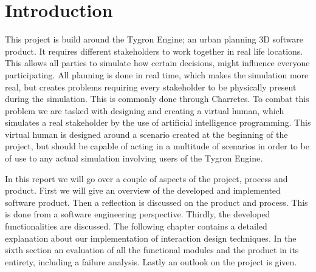 \section{Introduction}

This project is build around the Tygron Engine; an urban planning 3D software product. It requires different stakeholders to work together in real life locations. This allows all parties to simulate how certain decisions, might influence everyone participating. All planning is done in real time, which makes the simulation more real, but creates problems requiring every stakeholder to be physically present during the simulation. This is commonly done through Charretes\cite{Todd13}. To combat this problem we are tasked with designing and creating a virtual human, which simulates a real stakeholder by the use of artificial intelligence programming. This virtual human is designed around a scenario created at the beginning of the project, but should be capable of acting in a multitude of scenarios in order to be of use to any actual simulation involving users of the Tygron Engine.\newline

In this report we will go over a couple of aspects of the project, process and product.\newline
First we will give an overview of the developed and implemented software product. Then a reflection is discussed on the product and process. This is done from a software engineering perspective. Thirdly, the developed functionalities are discussed. The following chapter contains a detailed explanation about our implementation of interaction design techniques. In the sixth section an evaluation of all the functional modules and the product in its entirety, including a failure analysis. Lastly an outlook on the project is given.


\newpage
